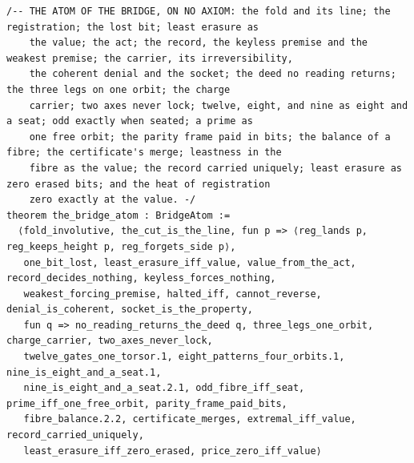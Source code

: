 \documentclass[10pt,twocolumn]{article}
\begin{document}
\begin{Verbatim}
/-- THE ATOM OF THE BRIDGE, ON NO AXIOM: the fold and its line; the registration; the lost bit; least erasure as
    the value; the act; the record, the keyless premise and the weakest premise; the carrier, its irreversibility,
    the coherent denial and the socket; the deed no reading returns; the three legs on one orbit; the charge
    carrier; two axes never lock; twelve, eight, and nine as eight and a seat; odd exactly when seated; a prime as
    one free orbit; the parity frame paid in bits; the balance of a fibre; the certificate's merge; leastness in the
    fibre as the value; the record carried uniquely; least erasure as zero erased bits; and the heat of registration
    zero exactly at the value. -/
theorem the_bridge_atom : BridgeAtom :=
  ⟨fold_involutive, the_cut_is_the_line, fun p => ⟨reg_lands p, reg_keeps_height p, reg_forgets_side p⟩,
   one_bit_lost, least_erasure_iff_value, value_from_the_act, record_decides_nothing, keyless_forces_nothing,
   weakest_forcing_premise, halted_iff, cannot_reverse, denial_is_coherent, socket_is_the_property,
   fun q => no_reading_returns_the_deed q, three_legs_one_orbit, charge_carrier, two_axes_never_lock,
   twelve_gates_one_torsor.1, eight_patterns_four_orbits.1, nine_is_eight_and_a_seat.1,
   nine_is_eight_and_a_seat.2.1, odd_fibre_iff_seat, prime_iff_one_free_orbit, parity_frame_paid_bits,
   fibre_balance.2.2, certificate_merges, extremal_iff_value, record_carried_uniquely,
   least_erasure_iff_zero_erased, price_zero_iff_value⟩


\end{Verbatim}
\end{document}
